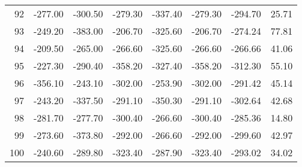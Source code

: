 \begin{longtable}{rrrrrrrr}
92 & -277.00 & -300.50 & -279.30 & -337.40 & -279.30 & -294.70 & 25.71  \\
93 & -249.20 & -383.00 & -206.70 & -325.60 & -206.70 & -274.24 & 77.81  \\
94 & -209.50 & -265.00 & -266.60 & -325.60 & -266.60 & -266.66 & 41.06  \\
95 & -227.30 & -290.40 & -358.20 & -327.40 & -358.20 & -312.30 & 55.10  \\
96 & -356.10 & -243.10 & -302.00 & -253.90 & -302.00 & -291.42 & 45.14  \\
97 & -243.20 & -337.50 & -291.10 & -350.30 & -291.10 & -302.64 & 42.68  \\
98 & -281.70 & -277.70 & -300.40 & -266.60 & -300.40 & -285.36 & 14.80  \\
99 & -273.60 & -373.80 & -292.00 & -266.60 & -292.00 & -299.60 & 42.97  \\
100 & -240.60 & -289.80 & -323.40 & -287.90 & -323.40 & -293.02 & 34.02  \\

\end{longtable}


